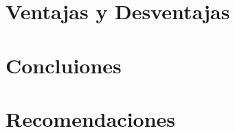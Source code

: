 \documentclass{llncs}
\begin{document}
\section{Ventajas y Desventajas}\label{sec:pros_cons}


\section{Concluiones}\label{sec:conc}


\section{Recomendaciones}\label{sec:rec}



%
%
\begin{thebibliography}{}
%

\end{thebibliography}
\clearpage
{} %
\renewcommand{\indexname}{Subject Index}

\end{document}
